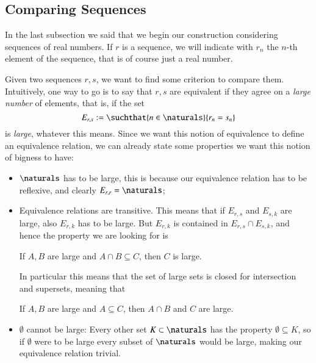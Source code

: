 \documentclass[adraft, copyright,creativecommons,sharealike,noncommercial]{eptcs}
\begin{document}
\subsection{Comparing Sequences}
In the last subsection we said that we begin our construction considering sequences of real numbers. If $r$ is a sequence, we will indicate with $r_n$ the $n$-th element of the sequence, that is of course just a real number.

Given two sequences $r, s$, we want to find some criterion to compare them. Intuitively, one way to go is to say that $r, s$ are equivalent if they agree on a \emph{large number} of elements, that is, if the set
\begin{equation*}
	E_{r,s} := \suchthat{n \in \naturals}{r_n = s_n}
\end{equation*}
is \emph{large}, whatever this means. Since we want this notion of equivalence to define an equivalence relation, we can already state some properties we want this notion of bigness to have:
\begin{itemize}
	\item $\naturals$ has to be large, this is because our equivalence relation has to be reflexive, and clearly $E_{r,r} = \naturals$;
	\item Equivalence relations are transitive. This means that if $E_{r,s}$ and $E_{s,k}$ are large, also $E_{r,k}$ has to be large. But $E_{r,k}$ is contained in $E_{r,s} \cap E_{s,k}$, and hence the property we are looking for is 
	\begin{center}
		If $A, B$ are large and $A \cap B \subseteq C$, then $C$ is large.
	\end{center}
	In particular this means that the set of large sets is closed for intersection and supersets, meaning that
	\begin{center}
		If $A,B$ are large and $A \subseteq C$, then $A \cap B$ and $C$ are large. 
	\end{center} 
	\item $\emptyset$ cannot be large: Every other set $K \subset \naturals$ has the property $\emptyset \subseteq K$, so if $\emptyset$ were to be large every subset of $\naturals$ would be large, making our equivalence relation trivial.
\end{itemize}
\end{document}
